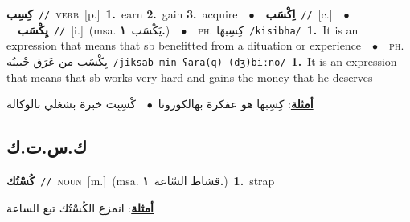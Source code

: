 \documentclass[10pt,a4paper,twoside]{article} %
\begin{document}
\begin{multicols}{2}
{\setlength\topsep{0pt}\textbf{\foreignlanguage{arabic}{كِسِب}}\ {\color{gray}\texttt{//}\color{black}}\ \textsc{verb}\ [p.]\ \textbf{1.}~earn  \textbf{2.}~gain  \textbf{3.}~acquire\ \ $\bullet$\ \ \setlength\topsep{0pt}\textbf{\foreignlanguage{arabic}{اِكْسَب}}\ {\color{gray}\texttt{//}\color{black}}\ [c.]\ \ $\bullet$\ \ \setlength\topsep{0pt}\textbf{\foreignlanguage{arabic}{يِكْسَب}}\ {\color{gray}\texttt{//}\color{black}}\ [i.]\ \color{gray}(msa. \foreignlanguage{arabic}{يَكْسَب}~\foreignlanguage{arabic}{\textbf{١.}})\color{black}\ \ $\bullet$\ \ \textsc{ph.} \color{gray} \foreignlanguage{arabic}{كِسِبهَا}\color{black}\ {\color{gray}\texttt{/{\sffamily kisibha}/}\color{black}}\ \textbf{1.}~It is an expression that means that sb benefitted from a dituation or experience\ \ $\bullet$\ \ \textsc{ph.} \color{gray} \foreignlanguage{arabic}{يِكْسَب من عَرَق جْبينُه}\color{black}\ {\color{gray}\texttt{/{\sffamily jiksab min ʕara(q) (dʒ)biːno}/}\color{black}}\ \textbf{1.}~It is an expression that means that sb works very hard and gains the money that he deserves\  \begin{flushright}\color{gray}\foreignlanguage{arabic}{\textbf{\underline{\foreignlanguage{arabic}{أمثلة}}}: كِسِبها هو عفكرة بهالكورونا\ $\bullet$\ \  كْسِبِت خبرة بشغلي بالوكالة}\end{flushright}\color{black}} \vspace{2mm}

\vspace{-3mm}
\subsection*{\color{blue}\foreignlanguage{arabic}{ك.س.ت.ك}\color{blue}{}} 

{\setlength\topsep{0pt}\textbf{\foreignlanguage{arabic}{كُسْتُك}}\ {\color{gray}\texttt{//}\color{black}}\ \textsc{noun}\ [m.]\ \color{gray}(msa. \foreignlanguage{arabic}{قشاط السّاعة}~\foreignlanguage{arabic}{\textbf{١.}})\color{black}\ \textbf{1.}~strap\  \begin{flushright}\color{gray}\foreignlanguage{arabic}{\textbf{\underline{\foreignlanguage{arabic}{أمثلة}}}: انمزع الكُسْتُك تبع الساعة}\end{flushright}\color{black}} \vspace{2mm}


\end{multicols}
\end{document}
